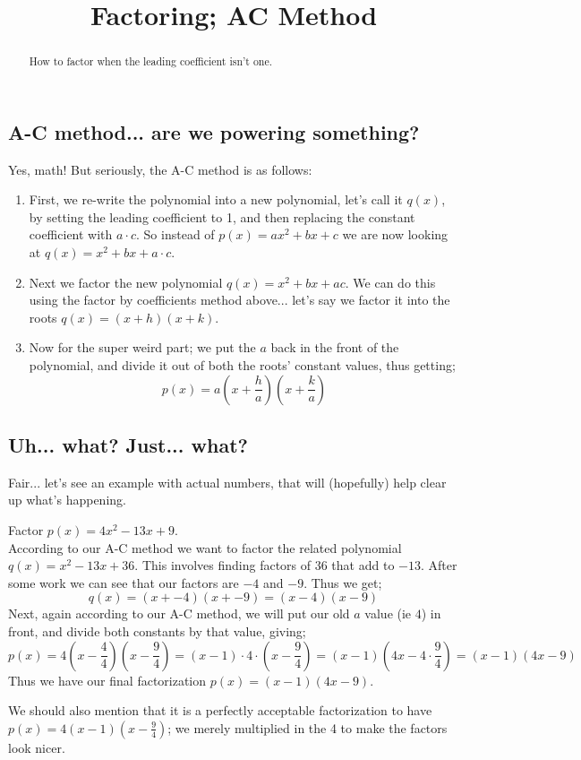 \documentclass{ximeraXloud}
\title{Factoring; AC Method}
\begin{document}
\begin{abstract}
    How to factor when the leading coefficient isn't one.
\end{abstract}
\maketitle

\subsection*{A-C method... are we powering something?}
    Yes, math! But seriously, the A-C method is as follows:
    \begin{enumerate}
        \item First, we re-write the polynomial into a new polynomial, let's call it $q(x)$, by setting the leading coefficient to 1, and then replacing the constant coefficient with $a \cdot c$. So instead of $p(x) = ax^2 + bx + c$ we are now looking at $q(x) = x^2 + bx + a\cdot c$.
        \item Next we factor the new polynomial $q(x) = x^2 + bx + ac$. We can do this using the factor by coefficients method above... let's say we factor it into the roots $q(x) = (x + h)(x + k)$.
        \item Now for the super weird part; we put the $a$ back in the front of the polynomial, and divide it out of both the roots' constant values, thus getting;
        \[
            p(x) = a\left(x + \frac{h}{a}\right)\left(x + \frac{k}{a}\right)
        \]
    \end{enumerate}

\subsection*{Uh... what? Just... what?}
    Fair... let's see an example with actual numbers, that will (hopefully) help clear up what's happening.
    
    \begin{example}
        Factor $p(x) = 4x^2 - 13x + 9$.\\
        
        According to our A-C method we want to factor the related polynomial $q(x) = x^2 - 13x + 36$. This involves finding factors of $36$ that add to $-13$. After some work we can see that our factors are $-4$ and $-9$. Thus we get;
        \[
            q(x) = (x + -4)(x + -9) = (x - 4)(x - 9)
        \]
        Next, again according to our A-C method, we will put our old $a$ value (ie $4$) in front, and divide both constants by that value, giving;
        \[
            p(x) = 4\left(x - \frac{4}{4}\right)\left(x - \frac{9}{4}\right)
            = (x - 1) \cdot 4 \cdot \left(x - \frac{9}{4}\right)
            = (x - 1)\left(4x - 4 \cdot \frac{9}{4}\right)
            = (x - 1)(4x - 9)
        \]
        Thus we have our final factorization $p(x) = (x - 1)(4x - 9)$.
    
        We should also mention that it is a perfectly acceptable factorization to have $p(x) = 4(x - 1)\left(x - \frac{9}{4}\right)$; we merely multiplied in the 4 to make the factors look nicer.
    \end{example}%
    
\end{document}
